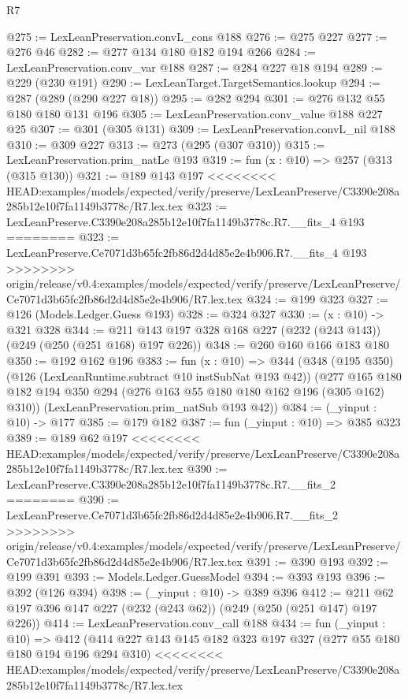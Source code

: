 \begin{lexlean}{R7}
\begin{coremodule}
{{{{{{{{{{{{{@275 := LexLeanPreservation.convL_cons @188
@276 := @275 @227
@277 := @276 @46
@282 := @277 @134 @180 @182 @194 @266
@284 := LexLeanPreservation.conv_var @188
@287 := @284 @227 @18 @194
@289 := @229 (@230 @191)
@290 := LexLeanTarget.TargetSemantics.lookup
@294 := @287 (@289 (@290 @227 @18))
@295 := @282 @294
@301 := @276 @132 @55 @180 @180 @131 @196
@305 := LexLeanPreservation.conv_value @188 @227 @25
@307 := @301 (@305 @131)
@309 := LexLeanPreservation.convL_nil @188
@310 := @309 @227
@313 := @273 (@295 (@307 @310))
@315 := LexLeanPreservation.prim_natLe @193
@319 := fun (x : @10) => @257 (@313 (@315 @130))
@321 := @189 @143 @197
<<<<<<<< HEAD:examples/models/expected/verify/preserve/LexLeanPreserve/C3390e208a285b12e10f7fa1149b3778c/R7.lex.tex
@323 := LexLeanPreserve.C3390e208a285b12e10f7fa1149b3778c.R7.__fits_4 @193
========
@323 := LexLeanPreserve.Ce7071d3b65fc2fb86d2d4d85e2e4b906.R7.__fits_4 @193
>>>>>>>> origin/release/v0.4:examples/models/expected/verify/preserve/LexLeanPreserve/Ce7071d3b65fc2fb86d2d4d85e2e4b906/R7.lex.tex
@324 := @199 @323
@327 := @126 (Models.Ledger.Guess @193)
@328 := @324 @327
@330 := (x : @10) -> @321 @328
@344 := @211 @143 @197 @328 @168 @227 (@232 (@243 @143)) (@249 (@250 (@251 @168) @197 @226))
@348 := @260 @160 @166 @183 @180
@350 := @192 @162 @196
@383 := fun (x : @10) =>
  @344
    (@348
      (@195 @350)
      (@126 (LexLeanRuntime.subtract @10 instSubNat @193 @42))
      (@277 @165 @180 @182 @194 @350 @294 (@276 @163 @55 @180 @180 @162 @196 (@305 @162) @310))
      (LexLeanPreservation.prim_natSub @193 @42))
@384 := (_yinput : @10) -> @177
@385 := @179 @182
@387 := fun (_yinput : @10) => @385 @323
@389 := @189 @62 @197
<<<<<<<< HEAD:examples/models/expected/verify/preserve/LexLeanPreserve/C3390e208a285b12e10f7fa1149b3778c/R7.lex.tex
@390 := LexLeanPreserve.C3390e208a285b12e10f7fa1149b3778c.R7.__fits_2
========
@390 := LexLeanPreserve.Ce7071d3b65fc2fb86d2d4d85e2e4b906.R7.__fits_2
>>>>>>>> origin/release/v0.4:examples/models/expected/verify/preserve/LexLeanPreserve/Ce7071d3b65fc2fb86d2d4d85e2e4b906/R7.lex.tex
@391 := @390 @193
@392 := @199 @391
@393 := Models.Ledger.GuessModel
@394 := @393 @193
@396 := @392 (@126 @394)
@398 := (_yinput : @10) -> @389 @396
@412 := @211 @62 @197 @396 @147 @227 (@232 (@243 @62)) (@249 (@250 (@251 @147) @197 @226))
@414 := LexLeanPreservation.conv_call @188
@434 := fun (_yinput : @10) =>
  @412
    (@414
      @227
      @143
      @145
      @182
      @323
      @197
      @327
      (@277 @55 @180 @180 @194 @196 @294 @310)
<<<<<<<< HEAD:examples/models/expected/verify/preserve/LexLeanPreserve/C3390e208a285b12e10f7fa1149b3778c/R7.lex.tex
}}}}}}}}}}}}}
\end{coremodule}
\end{lexlean}

